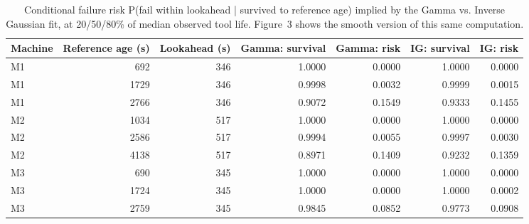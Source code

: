 \begin{table}[t]
\centering
\caption{Conditional failure risk P(fail within lookahead | survived to reference age) implied by the Gamma vs. Inverse Gaussian fit, at 20/50/80\% of median observed tool life. Figure~3 shows the smooth version of this same computation.}
\label{tab:conditional-risk}
\begin{tabular}{lrrrrrr}
\toprule
Machine & Reference age (s) & Lookahead (s) & Gamma: survival & Gamma: risk & IG: survival & IG: risk \\
\midrule
M1 & 692 & 346 & 1.0000 & 0.0000 & 1.0000 & 0.0000 \\
M1 & 1729 & 346 & 0.9998 & 0.0032 & 0.9999 & 0.0015 \\
M1 & 2766 & 346 & 0.9072 & 0.1549 & 0.9333 & 0.1455 \\
M2 & 1034 & 517 & 1.0000 & 0.0000 & 1.0000 & 0.0000 \\
M2 & 2586 & 517 & 0.9994 & 0.0055 & 0.9997 & 0.0030 \\
M2 & 4138 & 517 & 0.8971 & 0.1409 & 0.9232 & 0.1359 \\
M3 & 690 & 345 & 1.0000 & 0.0000 & 1.0000 & 0.0000 \\
M3 & 1724 & 345 & 1.0000 & 0.0000 & 1.0000 & 0.0002 \\
M3 & 2759 & 345 & 0.9845 & 0.0852 & 0.9773 & 0.0908 \\
\bottomrule
\end{tabular}
\end{table}
